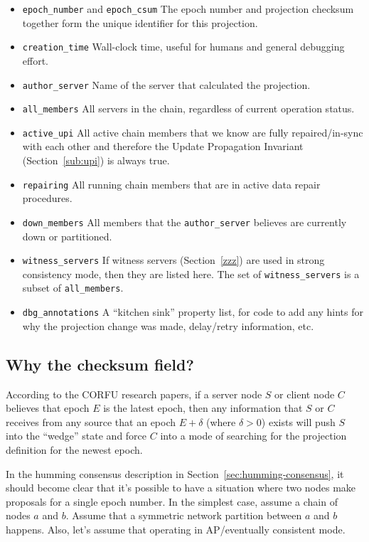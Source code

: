 \documentclass[preprint,10pt]{sigplanconf}
\begin{document}
\begin{itemize}
\item {\tt epoch\_number} and {\tt epoch\_csum} The epoch number and
  projection checksum together form the unique identifier for this projection.
\item {\tt creation\_time} Wall-clock time, useful for humans and
  general debugging effort.
\item {\tt author\_server} Name of the server that calculated the projection.
\item {\tt all\_members} All servers in the chain, regardless of current
  operation status.
\item {\tt active\_upi} All active chain members that we know are
  fully repaired/in-sync with each other and therefore the Update
  Propagation Invariant (Section~\ref{sub:upi}) is always true.
\item {\tt repairing} All running chain members that
  are in active data repair procedures.
\item {\tt down\_members} All members that the {\tt author\_server}
  believes are currently down or partitioned.
\item {\tt witness\_servers} If witness servers (Section~\ref{zzz})
  are used in strong consistency mode, then they are listed here.  The
  set of {\tt witness\_servers} is a subset of {\tt all\_members}.
\item {\tt dbg\_annotations} A ``kitchen sink'' property list, for code to
  add any hints for why the projection change was made, delay/retry
  information, etc.
\end{itemize}

\subsection{Why the checksum field?}

According to the CORFU research papers, if a server node $S$ or client
node $C$ believes that epoch $E$ is the latest epoch, then any information
that $S$ or $C$ receives from any source that an epoch $E+\delta$ (where
$\delta > 0$) exists will push $S$ into the ``wedge'' state
and force $C$ into a mode
of searching for the projection definition for the newest epoch.

In the humming consensus description in
Section~\ref{sec:humming-consensus}, it should become clear that it's
possible to have a situation where two nodes make proposals
for a single epoch number.  In the simplest case, assume a chain of
nodes $a$ and $b$.  Assume that a symmetric network partition between
$a$ and $b$ happens. Also, let's assume that operating in
AP/eventually consistent mode.
\end{document}
